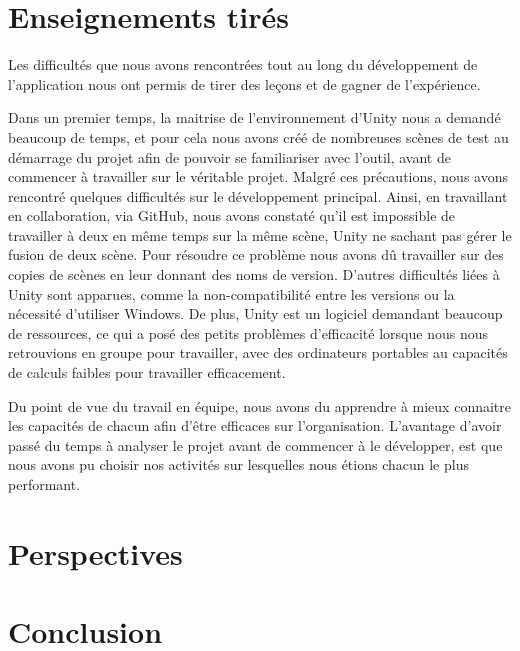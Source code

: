 \section{Enseignements tirés}
Les difficultés que nous avons rencontrées tout au long du développement de l'application nous ont permis de tirer des leçons et de gagner de l'expérience.

Dans un premier temps, la maitrise de l'environnement d'Unity nous a demandé beaucoup de temps, et pour cela nous avons créé de nombreuses scènes de test au démarrage du projet afin de pouvoir se familiariser avec l'outil, avant de commencer à travailler sur le véritable projet. Malgré ces précautions, nous avons rencontré quelques difficultés sur le développement principal. Ainsi, en travaillant en collaboration, via GitHub, nous avons constaté qu'il est impossible de travailler à deux en même temps sur la même scène, Unity ne sachant pas gérer le fusion de deux scène. Pour résoudre ce problème nous avons dû travailler sur des copies de scènes en leur donnant des noms de version. D'autres difficultés liées à Unity sont apparues, comme la non-compatibilité entre les versions ou la nécessité d'utiliser Windows. De plus, Unity est un logiciel demandant beaucoup de ressources, ce qui a posé des petits problèmes d'efficacité lorsque nous nous retrouvions en groupe pour travailler, avec des ordinateurs portables au capacités de calculs faibles pour travailler efficacement.

Du point de vue du travail en équipe, nous avons du apprendre à mieux connaitre les capacités de chacun afin d'être efficaces sur l'organisation. L'avantage d'avoir passé du temps à analyser le projet avant de commencer à le développer, est que nous avons pu choisir nos activités sur lesquelles nous étions chacun le plus performant.


\section{Perspectives}


\section{Conclusion}

